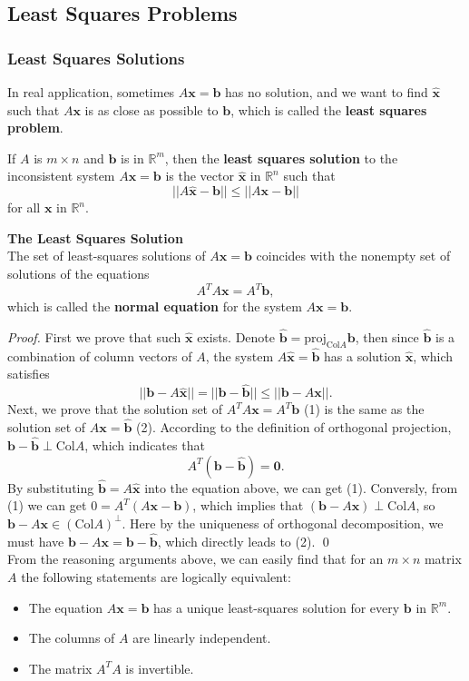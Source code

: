 \documentclass[10pt, a4paper]{article}
\newcommand{\R}{\mathbb{R}}
\newcommand{\vt}[1]{\mathbf{#1}}
\begin{document}
\subsection{Least Squares Problems}
\subsubsection*{Least Squares Solutions}
\indent In real application, sometimes $A\vt{x}=\vt{b}$ has no solution, and we want to find $\hat{\vt{x}}$ such that $A\vt{x}$ is as close as possible to $\vt{b}$, which is called the \textbf{least squares problem}.
\begin{definition}
    If $A$ is $m\times n$ and $\vt{b}$ is in $\R^m$, then the \textbf{least squares solution} to the inconsistent system $A\vt{x}=\vt{b}$ is the vector $\hat{\vt{x}}$ in $\R^n$ such that\[
    ||A\hat{\vt{x}}-\vt{b}|| \leq ||A\vt{x}-\vt{b}||
    \]
    for all $\vt{x}$ in $\R^n$.
\end{definition}
\begin{proposition}
    \textbf{The Least Squares Solution}\\
    The set of least-squares solutions of $A\vt{x}=\vt{b}$ coincides with the nonempty set of solutions of the equations \[
    A^TA\vt{x} = A^T\vt{b},
    \]
    which is called the \textbf{normal equation} for the system $A\vt{x}=\vt{b}$.
\end{proposition}
\indent \textit{Proof.} First we prove that such $\hat{\vt{x}}$ exists. Denote $\hat{\vt{b}}=\text{proj}_{\text{Col}A}\vt{b}$, then since $\hat{\vt{b}}$ is a combination of column vectors of $A$, 
the system $A\hat{\vt{x}}=\hat{\vt{b}}$ has a solution $\hat{\vt{x}}$, which satisfies\[
||\vt{b}-A\hat{\vt{x}}||=||\vt{b}-\hat{\vt{b}}||\leq||\vt{b}-A\vt{x}||.
\]
\indent Next, we prove that the solution set of $A^TA\vt{x}=A^T\vt{b}$ (1) is the same as the solution set of $A\vt{x}=\hat{\vt{b}}$ (2). 
According to the definition of orthogonal projection, $\vt{b}-\vt{\hat{b}}\perp \text{Col}A$, which indicates that $$A^T(\vt{b}-\vt{\hat{b}})=\vt{0}.$$ 
By substituting $\vt{\hat{b}}=A\hat{\vt{x}}$ into the equation above, we can get (1). 
Conversly, from (1) we can get $0=A^T(A\vt{x}-\vt{b})$, which implies that $(\vt{b}-A\vt{x})\perp \text{Col}A$, so $\vt{b}-A\vt{x}\in (\text{Col}A)^\perp$.
 Here by the uniqueness of orthogonal decomposition, we must have $\vt{b}-A\vt{x}=\vt{b}-\hat{\vt{b}}$, which directly leads to (2). \qed\\
\indent From the reasoning arguments above, we can easily find that for an $m\times n$ matrix $A$ the following statements are logically equivalent:
\begin{itemize}
    \item The equation $A\vt{x}=\vt{b}$ has a unique least-squares solution for every $\vt{b}$ in $\R^m$.
    \item The columns of $A$ are linearly independent.
    \item The matrix $A^TA$ is invertible.
\end{itemize}
\end{document}

